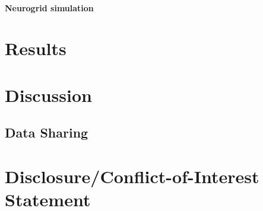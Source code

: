\documentclass{frontiersSCNS}
\begin{document}
\paragraph{Neurogrid simulation}

\section{Results}

\section{Discussion}

\subsection{Data Sharing}


\section*{Disclosure/Conflict-of-Interest Statement}

\end{document}
